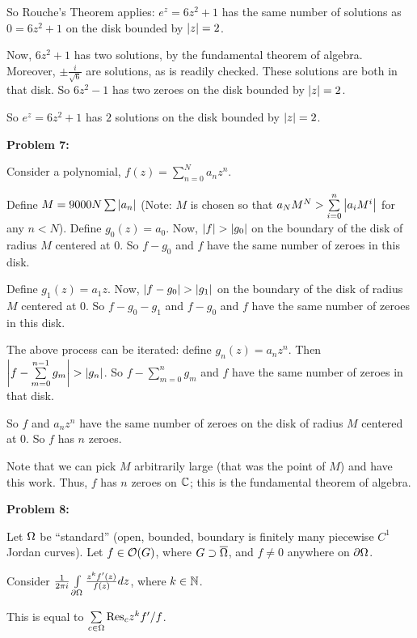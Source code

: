 \documentclass[a4paper,12pt]{article}
\begin{document}
So Rouche's Theorem applies: $e^z = 6z^2 +1$ has the same number of solutions as $0=6z^2 +1$ on the disk bounded by $\left\lvert z \right\rvert = 2$.

Now, $6z^2 +1$ has two solutions, by the fundamental theorem of algebra. Moreover, $\pm \frac{i}{\sqrt{6}}$ are solutions, as is readily checked. These solutions are both in that disk. So $6z^2-1$ has two zeroes on the disk bounded by $\left\lvert z \right\rvert = 2$.

So  $e^z = 6z^2 +1$ has $2$ solutions on the disk bounded by $\left\lvert z \right\rvert = 2$.

\shunt

{\bf Problem 7:}

Consider a polynomial, $f(z) = \sum\limits_{n=0}^N a_nz^n$.

Define $M = 9000N \sum \limits \left\lvert a_n \right\rvert$ (Note: $M$ is chosen so that $a_NM^N > \sum\limits_{i=0}^n \left\lvert a_iM^i \right\rvert$ for any $n <N$). Define $g_0(z) = a_0$. Now, $\left\lvert f \right\rvert > \left\lvert g_0 \right\rvert$ on the boundary of the disk of radius $M$ centered at $0$. So $f-g_0$ and $f$ have the same number of zeroes in this disk.

Define $g_1(z) = a_1z$. Now, $\left\lvert f-g_0 \right\rvert > \left\lvert g_1 \right\rvert$ on the boundary of the disk of radius $M$ centered at $0$. So $f-g_0-g_1$ and $f-g_0$ and $f$ have the same number of zeroes in this disk.

The above process can be iterated: define $g_n(z) = a_nz^n$. Then $\left\lvert f-\sum\limits_{m=0}^{n-1} g_m \right\rvert > \left\lvert g_n \right\rvert$. So $f-\sum\limits_{m=0}^{n} g_m$ and $f$ have the same number of zeroes in that disk.

So $f$ and $a_nz^n$ have the same number of zeroes on the disk of radius $M$ centered at $0$. So $f$ has $n$ zeroes.

Note that we can pick $M$ arbitrarily large (that was the point of $M$) and have this work. Thus, $f$ has $n$ zeroes on $\mathbb{C}$; this is the fundamental theorem of algebra.

\shunt

{\bf Problem 8:}

Let $\Omega$ be ``standard'' (open, bounded, boundary is finitely many piecewise $C^1$ Jordan curves). Let $f \in \mathcal{O}(G)$, where $G \supset \overline{\Omega}$, and $f \neq 0$ anywhere on $\partial \Omega$.

Consider $\frac{1}{2\pi i} \int\limits_{\partial \Omega} \frac{z^k f'(z)}{f(z)} dz$, where $k \in \mathbb{N}$.

This is equal to $\sum\limits_{c \in \Omega} \text{Res}_c z^k f'/f$.
\end{document}
